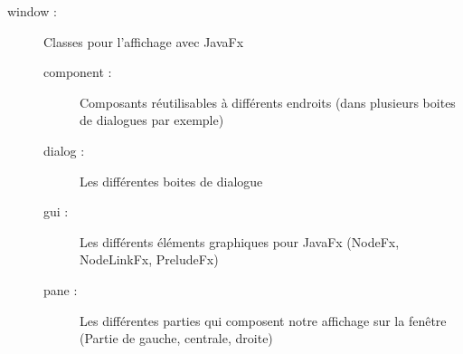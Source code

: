 \begin{description}
			\item[window :]{Classes pour l'affichage avec JavaFx}
			\begin{description}
				\item[component :]{Composants réutilisables à différents endroits (dans plusieurs boites de dialogues par exemple)}
				\item[dialog :]{Les différentes boites de dialogue}
				\item[gui :]{Les différents éléments graphiques pour JavaFx (NodeFx, NodeLinkFx, PreludeFx)}
				\item[pane :]{Les différentes parties qui composent notre affichage sur la fenêtre (Partie de gauche, centrale, droite)}
			\end{description}
		\end{description}
